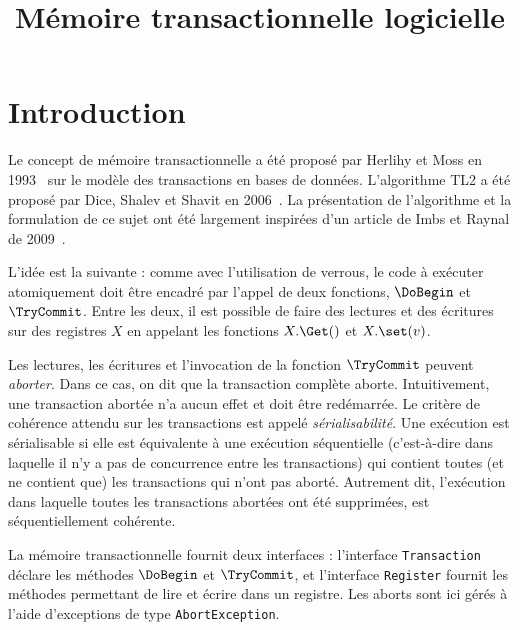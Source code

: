 \documentclass{td}
\title{Mémoire transactionnelle logicielle}
\begin{document}
\maketitle





\section{Introduction}
Le concept de mémoire transactionnelle a été proposé par Herlihy et Moss en 1993~\cite{HM} sur le modèle des transactions en bases de données.
L'algorithme TL2 a été proposé par Dice, Shalev et Shavit en 2006~\cite{DSS}. La présentation de l'algorithme et la formulation de ce sujet ont été largement inspirées
d'un article de Imbs et Raynal de 2009~\cite{IR}. 


L'idée est la suivante : comme avec l'utilisation de verrous, le code à exécuter atomiquement
doit être encadré par l'appel de deux fonctions, $\DoBegin$ et $\TryCommit$.
Entre les deux, il est possible de faire des lectures et des écritures sur des registres $X$
en appelant les fonctions $X.\Get()$ et $X.\set(v)$.

Les lectures, les écritures et l'invocation de la fonction $\TryCommit$ peuvent \emph{aborter}. Dans ce cas, on dit
que la transaction complète aborte. Intuitivement, une transaction abortée n'a aucun effet et doit être redémarrée.
Le critère de cohérence attendu sur les transactions est appelé
\emph{sérialisabilité}.
Une exécution est sérialisable si elle est équivalente à une exécution séquentielle
(c'est-à-dire dans laquelle il n'y a pas de concurrence entre les transactions)
qui contient toutes (et ne contient que) les transactions qui n'ont pas aborté.
Autrement dit, l'exécution dans laquelle toutes les transactions abortées ont été supprimées,
est séquentiellement cohérente. 

La mémoire transactionnelle fournit deux interfaces :
l'interface \lstinline{Transaction} déclare les méthodes $\DoBegin$ et $\TryCommit$,
et l'interface \lstinline{Register} fournit les méthodes permettant de
lire et écrire dans un registre. 
Les aborts sont ici gérés à l'aide d'exceptions de type \lstinline{AbortException}.
\end{document}
